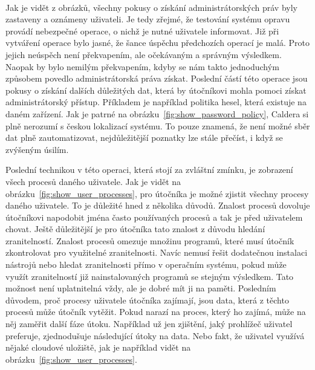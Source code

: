 ~
~
~


Jak je vidět z obrázků, všechny pokusy o získání administrátorských práv byly zastaveny a oznámeny uživateli.
Je tedy zřejmé, že testování systému opravu provádí nebezpečné operace, o nichž je nutné uživatele informovat.
Již při vytváření operace bylo jasné, že šance úspěchu předchozích operací je malá.
Proto jejich neúspěch není překvapením, ale očekávaným a správným výsledkem.
Naopak by bylo nemilým překvapením, kdyby se nám takto jednoduchým způsobem povedlo administrátorská práva získat.
Poslední částí této operace jsou pokusy o získání dalších důležitých dat, která by útočníkovi mohla pomoci získat administrátorský přístup.
Příkladem je například politika hesel, která existuje na daném zařízení.
Jak je patrné na obrázku~\ref{fig:show_password_policy}, Caldera si plně nerozumí s českou lokalizací systému.
To pouze znamená, že není možné sběr dat plně zautomatizovat, nejdůležitější poznatky lze stále přečíst, i když se zvýšeným úsilím.



Poslední technikou v této operaci, která stojí za zvláštní zmínku, je zobrazení všech procesů daného uživatele.
Jak je vidět na obrázku~\ref{fig:show_user_processes}, pro útočníka je možné zjistit všechny procesy daného uživatele.
To je důležité hned z několika důvodů.
Znalost procesů dovoluje útočníkovi napodobit jména často používaných procesů a tak je před uživatelem chovat.
Ještě důležitější je pro útočníka tato znalost z důvodu hledání zranitelností.
Znalost procesů omezuje množinu programů, které musí útočník zkontrolovat pro využitelné zranitelnosti.
Navíc nemusí řešit dodatečnou instalaci nástrojů nebo hledat zranitelnosti přímo v operačním systému, pokud může využít zranitelností již nainstalovaných programů se stejným výsledkem.
Tato možnost není uplatnitelná vždy, ale je dobré mít ji na paměti.
Posledním důvodem, proč procesy uživatele útočníka zajímají, jsou data, která z těchto procesů může útočník vytěžit.
Pokud narazí na proces, který ho zajímá, může na něj zaměřit další fáze útoku.
Například už jen zjištění, jaký prohlížeč uživatel preferuje, zjednodušuje následující útoky na data.
Nebo fakt, že uživatel využívá nějaké cloudové uložiště, jak je například vidět na obrázku~\ref{fig:show_user_processes}.

